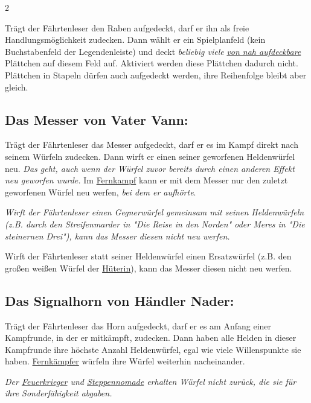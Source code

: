 \documentclass[10pt, a4paper, oneside]{book}
\newcommand{\fan}[1]{\textit{#1}}
\begin{document}
\begin{multicols*}{2}
\begin{nobgcolor}
Trägt der Fährtenleser den Raben aufgedeckt, darf er ihn als freie Handlungsmöglichkeit zudecken. Dann wählt er ein Spielplanfeld (kein Buchstabenfeld der Legendenleiste) und deckt \fan{beliebig viele} \hyperref[aufdecken]{\fan{von nah aufdeckbare}} Plättchen auf diesem Feld auf.
\supercite{nh-begleitheft}
Aktiviert werden diese Plättchen dadurch nicht. Plättchen in Stapeln dürfen auch aufgedeckt werden, ihre Reihenfolge bleibt aber gleich.
\supercite{bl-bdm-a3-en}


\subsection{Das Messer von Vater Vann:}

Trägt der Fährtenleser das Messer aufgedeckt, darf er es im Kampf direkt nach seinem Würfeln zudecken. Dann wirft er einen seiner geworfenen Heldenwürfel neu.
\supercite{nh-begleitheft}
\fan{Das geht, auch wenn der Würfel zuvor bereits durch einen anderen Effekt neu geworfen wurde.} Im \hyperref[fernkaempfer]{Fernkampf} kann er mit dem Messer nur den zuletzt geworfenen Würfel neu werfen,\supercite{dridn-begleitheft} \fan{bei dem er aufhörte}.


\fan{Wirft der Fährtenleser einen Gegnerwürfel gemeinsam mit seinen Heldenwürfeln (z.B. durch den Streifenmarder in "Die Reise in den Norden" oder Meres in "Die steinernen Drei"), kann das Messer diesen nicht neu werfen.}

Wirft der Fährtenleser statt seiner Heldenwürfel einen Ersatzwürfel (z.B. den großen weißen Würfel der \hyperref[hueterin]{Hüterin}), kann das Messer diesen nicht neu werfen.
\supercite{5460}

\columnbreak

\subsection{Das Signalhorn von Händler Nader:}

Trägt der Fährtenleser das Horn aufgedeckt, darf er es am Anfang einer Kampfrunde, in der er mitkämpft, zudecken. Dann haben alle Helden in dieser Kampfrunde ihre höchste Anzahl Heldenwürfel, egal wie viele Willenspunkte sie haben. 
\hyperref[fernkaempfer]{Fernkämpfer} würfeln ihre Würfel weiterhin nacheinander.
\supercite{nh-begleitheft}

\fan{Der \hyperref[feuerkrieger]{Feuerkrieger} und \hyperref[steppennomade]{Steppennomade} erhalten Würfel nicht zurück, die sie für ihre Sonderfähigkeit abgaben.}


\end{nobgcolor}
\end{multicols*}
\end{document}
